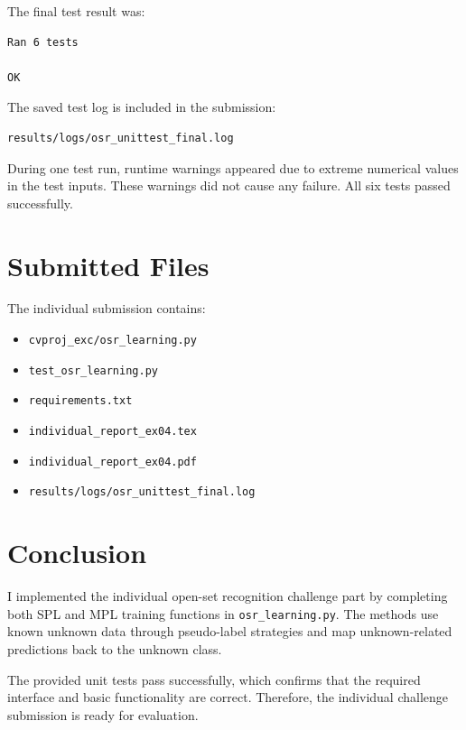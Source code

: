 \documentclass[11pt,a4paper]{article}
\begin{document}
The final test result was:

\begin{lstlisting}
Ran 6 tests

OK
\end{lstlisting}

The saved test log is included in the submission:

\begin{lstlisting}
results/logs/osr_unittest_final.log
\end{lstlisting}

During one test run, runtime warnings appeared due to extreme numerical values in the test inputs. These warnings did not cause any failure. All six tests passed successfully.

\section{Submitted Files}

The individual submission contains:

\begin{itemize}[noitemsep]
    \item \texttt{cvproj\_exc/osr\_learning.py}
    \item \texttt{test\_osr\_learning.py}
    \item \texttt{requirements.txt}
    \item \texttt{individual\_report\_ex04.tex}
    \item \texttt{individual\_report\_ex04.pdf}
    \item \texttt{results/logs/osr\_unittest\_final.log}
\end{itemize}

\section{Conclusion}

I implemented the individual open-set recognition challenge part by completing both SPL and MPL training functions in \texttt{osr\_learning.py}. The methods use known unknown data through pseudo-label strategies and map unknown-related predictions back to the unknown class.

The provided unit tests pass successfully, which confirms that the required interface and basic functionality are correct. Therefore, the individual challenge submission is ready for evaluation.
\end{document}
